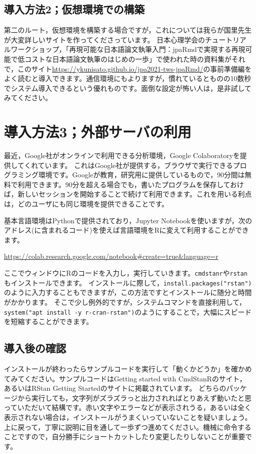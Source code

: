 \documentclass{ltjsbook}
\begin{document}
\subsection{導入方法2；仮想環境での構築}

第二のルート，仮想環境を構築する場合ですが，これについては我らが国里先生が大変詳しいサイトを作ってくださっています。
日本心理学会のチュートリアルワークショップ，「再現可能な日本語論文執筆入門：jpaRmdで実現する再現可能で低コストな日本語論文執筆のはじめの一歩」で使われた時の資料集がそれで，このサイト\url{https://ykunisato.github.io/jpa2021-tws-jpaRmd/}の事前準備編をよく読むと導入できます。通信環境にもよりますが，慣れているとものの10数秒でシステム導入できるという優れものです。面倒な設定が怖い人は，是非試してみてください。


\section{導入方法3；外部サーバの利用}

最近，Google社がオンラインで利用できる分析環境，Google Colaboratoryを提供してくれています。
これはGoogle社が提供する，ブラウザで実行できるプログラミング環境です。Googleが教育，研究用に提供しているもので，90分間は無料で利用できます。90分を超える場合でも，書いたプログラムを保存しておけば，新しいセッションを開始することで続けて利用できます。これを用いる利点は，どのユーザにも同じ環境を提供できることです。

基本言語環境はPythonで提供されており，Jupyter Notebookを使いますが，次のアドレス(に含まれるコード)を使えば言語環境をRに変えて利用することができます。
\begin{center}
	\url{https://colab.research.google.com/notebook#create=true&language=r}
\end{center}

ここでウィンドウにRのコードを入力し，実行していきます。\texttt{cmdstanr}や\texttt{rstan}もインストールできます。
インストールに際して，\verb|install.packages("rstan")|のように入力することもできますが，この方法ですとインストールに随分と時間がかかります。
そこで少し例外的ですが，システムコマンドを直接利用して，\verb|system("apt install -y r-cran-rstan")|のようにすることで，大幅にスピードを短縮することができます。

\subsection{導入後の確認}
インストールが終わったらサンプルコードを実行して「動くかどうか」を確かめてみてください。サンプルコードはGetting started with CmdStanRのサイト，あるいはRStan Getting Startedのサイトに掲載されています。
どちらのパッケージから実行しても，文字列がズラズラっと出力されればとりあえず動いたと思っていただいて結構です。赤い文字やエラーなどが表示されうる，あるいは全く表示されない場合は，インストールがうまくいっていないことを疑いましょう。上に戻って，丁寧に説明に目を通して一歩ずつ進めてください。機械に命令することですので，自分勝手にショートカットしたり変更したりしないことが重要です。
\end{document}

